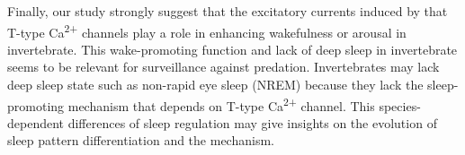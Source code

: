 Finally, our study strongly suggest that the excitatory currents induced by that T-type Ca\textsuperscript{2+} channels play a role in enhancing wakefulness or arousal in invertebrate.
This wake-promoting function and lack of deep sleep in invertebrate seems to be relevant for surveillance against predation.
Invertebrates may lack deep sleep state such as non-rapid eye sleep (NREM) because they lack the sleep-promoting mechanism that depends on T-type Ca\textsuperscript{2+} channel.
This species-dependent differences of sleep regulation may give insights on the evolution of sleep pattern differentiation and the mechanism.
  
  